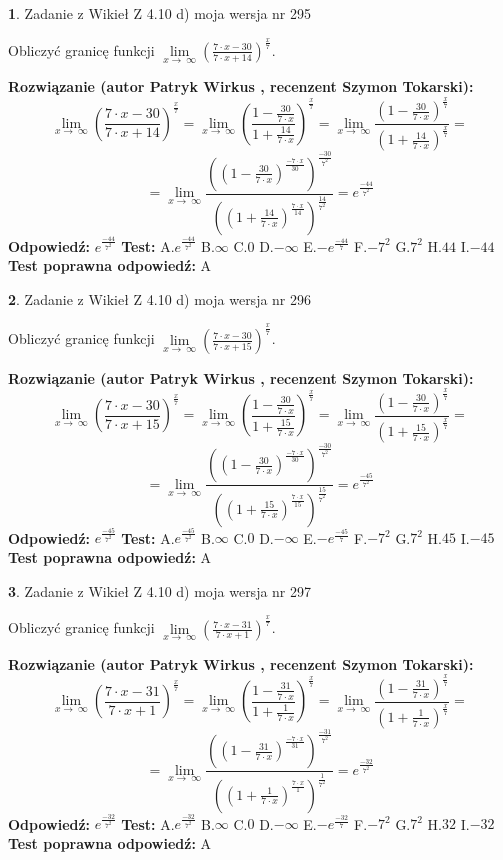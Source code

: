 \documentclass[12pt, a4paper]{article}
\theoremstyle{definition} %
\newtheorem{zad}{}
\newcommand{\zadStart}[1]{\begin{zad}#1\newline}
\newcommand{\zadStop}{\end{zad}}
\newcommand{\rozwStart}[2]{\noindent \textbf{Rozwiązanie (autor #1 , recenzent #2): }\newline}
\newcommand{\rozwStop}{\newline}
\newcommand{\odpStart}{\noindent \textbf{Odpowiedź:}\newline}
\newcommand{\odpStop}{\newline}
\newcommand{\testStart}{\noindent \textbf{Test:}\newline}
\newcommand{\testStop}{\newline}
\newcommand{\kluczStart}{\noindent \textbf{Test poprawna odpowiedź:}\newline}
\newcommand{\kluczStop}{\newline}
\begin{document}
\zadStart{Zadanie z Wikieł Z 4.10 d) moja wersja nr 295}


Obliczyć granicę funkcji  $\lim\limits_{x\to\ \infty}(\frac{7\cdot x-30}{7\cdot x+14})^{\frac{x}{7}}$.
\zadStop
\rozwStart{Patryk Wirkus}{Szymon Tokarski}
$$\lim\limits_{x\to\ \infty}(\frac{7\cdot x-30}{7\cdot x+14})^{\frac{x}{7}} = \lim\limits_{x\to\ \infty}(\frac{1-\frac{30}{7\cdot x}}{1+\frac{14}{7\cdot x}})^{\frac{x}{7}}=\lim\limits_{x\to\ \infty}\frac{(1-\frac{30}{7\cdot x})^{\frac{x}{7}}}{(1+\frac{14}{7\cdot x})^{\frac{x}{7}}}=$$
$$=\lim\limits_{x\to\ \infty}\frac{((1-\frac{30}{7\cdot x})^{\frac{-7\cdot x}{30}})^{\frac{-30}{7^{2}}}}{((1+\frac{14}{7\cdot x})^{\frac{7\cdot x}{14}})^{\frac{14}{7^{2}}}}=e^{\frac{-44}{7^{2}}}$$
\rozwStop
\odpStart
$e^{\frac{-44}{7^{2}}}$
\odpStop
\testStart
A.$e^{\frac{-44}{7^{2}}}$ B.$\infty$ C.$0$ D.$-\infty$ E.$-e^{\frac{-44}{7}}$
F.$-7^{2}$ G.$7^{2}$
H.$44$
I.$-44$
\testStop
\kluczStart
A
\kluczStop



\zadStart{Zadanie z Wikieł Z 4.10 d) moja wersja nr 296}


Obliczyć granicę funkcji  $\lim\limits_{x\to\ \infty}(\frac{7\cdot x-30}{7\cdot x+15})^{\frac{x}{7}}$.
\zadStop
\rozwStart{Patryk Wirkus}{Szymon Tokarski}
$$\lim\limits_{x\to\ \infty}(\frac{7\cdot x-30}{7\cdot x+15})^{\frac{x}{7}} = \lim\limits_{x\to\ \infty}(\frac{1-\frac{30}{7\cdot x}}{1+\frac{15}{7\cdot x}})^{\frac{x}{7}}=\lim\limits_{x\to\ \infty}\frac{(1-\frac{30}{7\cdot x})^{\frac{x}{7}}}{(1+\frac{15}{7\cdot x})^{\frac{x}{7}}}=$$
$$=\lim\limits_{x\to\ \infty}\frac{((1-\frac{30}{7\cdot x})^{\frac{-7\cdot x}{30}})^{\frac{-30}{7^{2}}}}{((1+\frac{15}{7\cdot x})^{\frac{7\cdot x}{15}})^{\frac{15}{7^{2}}}}=e^{\frac{-45}{7^{2}}}$$
\rozwStop
\odpStart
$e^{\frac{-45}{7^{2}}}$
\odpStop
\testStart
A.$e^{\frac{-45}{7^{2}}}$ B.$\infty$ C.$0$ D.$-\infty$ E.$-e^{\frac{-45}{7}}$
F.$-7^{2}$ G.$7^{2}$
H.$45$
I.$-45$
\testStop
\kluczStart
A
\kluczStop



\zadStart{Zadanie z Wikieł Z 4.10 d) moja wersja nr 297}


Obliczyć granicę funkcji  $\lim\limits_{x\to\ \infty}(\frac{7\cdot x-31}{7\cdot x+1})^{\frac{x}{7}}$.
\zadStop
\rozwStart{Patryk Wirkus}{Szymon Tokarski}
$$\lim\limits_{x\to\ \infty}(\frac{7\cdot x-31}{7\cdot x+1})^{\frac{x}{7}} = \lim\limits_{x\to\ \infty}(\frac{1-\frac{31}{7\cdot x}}{1+\frac{1}{7\cdot x}})^{\frac{x}{7}}=\lim\limits_{x\to\ \infty}\frac{(1-\frac{31}{7\cdot x})^{\frac{x}{7}}}{(1+\frac{1}{7\cdot x})^{\frac{x}{7}}}=$$
$$=\lim\limits_{x\to\ \infty}\frac{((1-\frac{31}{7\cdot x})^{\frac{-7\cdot x}{31}})^{\frac{-31}{7^{2}}}}{((1+\frac{1}{7\cdot x})^{\frac{7\cdot x}{1}})^{\frac{1}{7^{2}}}}=e^{\frac{-32}{7^{2}}}$$
\rozwStop
\odpStart
$e^{\frac{-32}{7^{2}}}$
\odpStop
\testStart
A.$e^{\frac{-32}{7^{2}}}$ B.$\infty$ C.$0$ D.$-\infty$ E.$-e^{\frac{-32}{7}}$
F.$-7^{2}$ G.$7^{2}$
H.$32$
I.$-32$
\testStop
\kluczStart
A
\kluczStop
\end{document}
